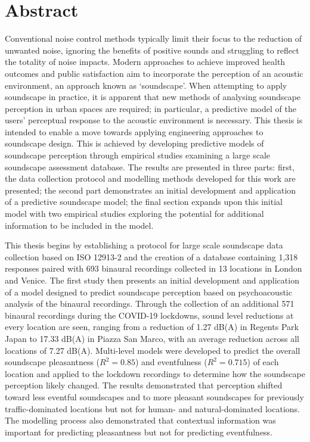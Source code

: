 \documentclass[oneside,fontsize=11pt,titlepage,chapterprefix=true
]{scrbook}
\begin{document}
\chapter*{Abstract}
Conventional noise control methods typically limit their focus to the reduction of unwanted noise, ignoring the benefits of positive sounds and struggling to reflect the totality of noise impacts. Modern approaches to achieve improved health outcomes and public satisfaction aim to incorporate the perception of an acoustic environment, an approach known as `soundscape'. When attempting to apply soundscape in practice, it is apparent that new methods of analysing soundscape perception in urban spaces are required; in particular, a predictive model of the users' perceptual response to the acoustic environment is necessary. This thesis is intended to enable a move towards applying engineering approaches to soundscape design. This is achieved by developing predictive models of soundscape perception through empirical studies examining a large scale soundscape assessment database. The results are presented in three parts: first, the data collection protocol and modelling methods developed for this work are presented; the second part demonstrates an initial development and application of a predictive soundscape model; the final section expands upon this initial model with two empirical studies exploring the potential for additional information to be included in the model.

This thesis begins by establishing a protocol for large scale soundscape data collection based on ISO 12913-2 and the creation of a database containing 1,318 responses paired with 693 binaural recordings collected in 13 locations in London and Venice. The first study then presents an initial development and application of a model designed to predict soundscape perception based on psychoacoustic analysis of the binaural recordings. Through the collection of an additional 571 binaural recordings during the COVID-19 lockdowns, sound level reductions at every location are seen, ranging from a reduction of 1.27 dB(A) in Regents Park Japan to 17.33 dB(A) in Piazza San Marco, with an average reduction across all locations of 7.27 dB(A). Multi-level models were developed to predict the overall soundscape pleasantness ($R^2=0.85$) and eventfulness ($R^2=0.715$) of each location and applied to the lockdown recordings to determine how the soundscape perception likely changed. The results demonstrated that perception shifted toward less eventful soundscapes and to more pleasant soundscapes for previously traffic-dominated locations but not for human- and natural-dominated locations. The modelling process also demonstrated that contextual information was important for predicting pleasantness but not for predicting eventfulness.
\end{document}

